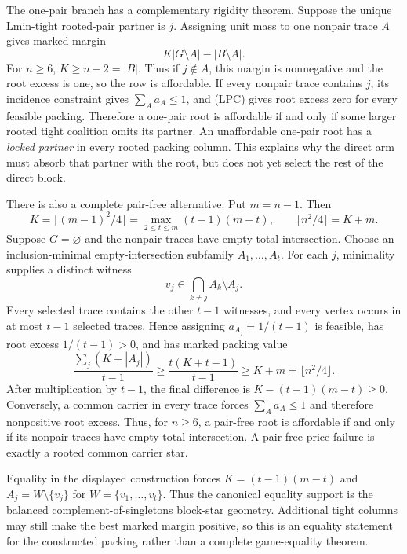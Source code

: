 \documentclass[11pt]{article}
\begin{document}
The one-pair branch has a complementary rigidity theorem.  Suppose the
unique Lmin-tight rooted-pair partner is $j$.  Assigning unit mass to one
nonpair trace $A$ gives marked margin
\[
 K|G\setminus A|-|B\setminus A|.                    \tag{LPC3}
\]
For $n\ge6$, $K\ge n-2=|B|$.  Thus if $j\notin A$, this margin is
nonnegative and the root excess is one, so the row is affordable.  If every
nonpair trace contains $j$, its incidence constraint gives
$\sum_Aa_A\le1$, and (LPC) gives root excess zero for every feasible
packing.  Therefore a one-pair root is affordable if and only if some larger
rooted tight coalition omits its partner.  An unaffordable one-pair root has
a \emph{locked partner} in every rooted packing column.  This explains why
the direct arm must absorb that partner with the root, but does not yet
select the rest of the direct block.

There is also a complete pair-free alternative.  Put $m=n-1$.  Then
\[
 K=\lfloor(m-1)^2/4\rfloor
   =\max_{2\le t\le m}(t-1)(m-t),
 \qquad \lfloor n^2/4\rfloor=K+m.                   \tag{LPC4}
\]
Suppose $G=\varnothing$ and the nonpair traces have empty total
intersection.  Choose an inclusion-minimal empty-intersection subfamily
$A_1,\ldots,A_t$.  For each $j$, minimality supplies a distinct witness
\[
 v_j\in\bigcap_{k\ne j}A_k\setminus A_j.
\]
Every selected trace contains the other $t-1$ witnesses, and every vertex
occurs in at most $t-1$ selected traces.  Hence assigning
$a_{A_j}=1/(t-1)$ is feasible, has root excess $1/(t-1)>0$, and has marked
packing value
\[
 \frac{\sum_j(K+|A_j|)}{t-1}
 \ge \frac{t(K+t-1)}{t-1}
 \ge K+m=\lfloor n^2/4\rfloor.                      \tag{LPC5}
\]
After multiplication by $t-1$, the final difference is
$K-(t-1)(m-t)\ge0$.  Conversely, a common carrier in every trace forces
$\sum_Aa_A\le1$ and therefore nonpositive root excess.  Thus, for $n\ge6$,
a pair-free root is affordable if and only if its nonpair traces have empty
total intersection.  A pair-free price failure is exactly a rooted common
carrier star.

Equality in the displayed construction forces
$K=(t-1)(m-t)$ and $A_j=W\setminus\{v_j\}$ for
$W=\{v_1,\ldots,v_t\}$.  Thus the canonical equality support is the balanced
complement-of-singletons block-star geometry.  Additional tight columns may
still make the best marked margin positive, so this is an equality statement
for the constructed packing rather than a complete game-equality theorem.
\end{document}

